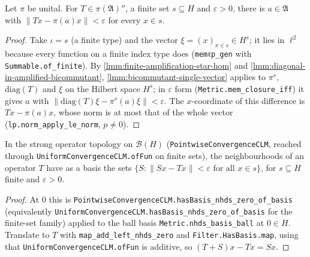 \begin{lemma}
    \label{lmm:bicommutant-finite-vectors}
    \leanok
    Let $\pi$ be unital. For $T \in \pi(\mathfrak{A})''$, a finite set $s \subseteq H$ and $\varepsilon > 0$, there is $a \in \mathfrak{A}$ with $\lVert T x - \pi(a) x \rVert < \varepsilon$ for every $x \in s$.
\end{lemma}
\begin{proof}
    \leanok
    Take $\iota = s$ (a finite type) and the vector $\xi = (x)_{x \in s} \in H^s$; it lies in $\ell^2$ because every function on a finite index type does (\texttt{memℓp\_gen} with \texttt{Summable.of\_finite}). By \ref{lmm:finite-amplification-star-hom} and \ref{lmm:diagonal-in-amplified-bicommutant}, \ref{lmm:bicommutant-single-vector} applies to $\pi^s$, $\mathrm{diag}(T)$ and $\xi$ on the Hilbert space $H^s$; in $\varepsilon$ form (\texttt{Metric.mem\_closure\_iff}) it gives $a$ with $\lVert \mathrm{diag}(T)\xi - \pi^s(a)\xi \rVert < \varepsilon$. The $x$-coordinate of this difference is $Tx - \pi(a)x$, whose norm is at most that of the whole vector (\texttt{lp.norm\_apply\_le\_norm}, $p \ne 0$).
\end{proof}

\begin{lemma}
    \label{lmm:strong-neighbourhood-basis}
    \leanok
    In the strong operator topology on $\mathcal{B}(H)$ (\texttt{PointwiseConvergenceCLM}, reached through \texttt{UniformConvergenceCLM.ofFun} on finite sets), the neighbourhoods of an operator $T$ have as a basis the sets $\{S : \lVert Sx - Tx \rVert < \varepsilon \text{ for all } x \in s\}$, for $s \subseteq H$ finite and $\varepsilon > 0$.
\end{lemma}
\begin{proof}
    \leanok
    At $0$ this is \texttt{PointwiseConvergenceCLM.hasBasis\_nhds\_zero\_of\_basis} (equivalently \texttt{UniformConvergenceCLM.hasBasis\_nhds\_zero\_of\_basis} for the finite-set family) applied to the ball basis \texttt{Metric.nhds\_basis\_ball} at $0 \in H$. Translate to $T$ with \texttt{map\_add\_left\_nhds\_zero} and \texttt{Filter.HasBasis.map}, using that \texttt{UniformConvergenceCLM.ofFun} is additive, so $(T + S)x - Tx = Sx$.
\end{proof}

